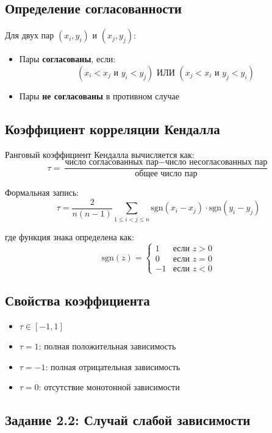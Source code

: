 \documentclass{article}
\begin{document}
\subsection{Определение согласованности}

Для двух пар $(x_i, y_i)$ и $(x_j, y_j)$:
\begin{itemize}
    \item Пары \textbf{согласованы}, если:
    \[ (x_i < x_j \text{ и } y_i < y_j) \text{ ИЛИ } (x_j < x_i \text{ и } y_j < y_i) \]
    \item Пары \textbf{не согласованы} в противном случае
\end{itemize}

\subsection{Коэффициент корреляции Кендалла}

Ранговый коэффициент Кендалла вычисляется как:
\[ \tau = \frac{\text{число согласованных пар} - \text{число несогласованных пар}}{\text{общее число пар}} \]

Формальная запись:
\[ \tau = \frac{2}{n(n-1)} \sum_{1 \leq i < j \leq n} \text{sgn}(x_i - x_j) \cdot \text{sgn}(y_i - y_j) \]

где функция знака определена как:
\[ \text{sgn}(z) = \begin{cases} 
1 & \text{если } z > 0 \\
0 & \text{если } z = 0 \\
-1 & \text{если } z < 0 
\end{cases} \]

\subsection{Свойства коэффициента}
\begin{itemize}
    \item $\tau \in [-1, 1]$
    \item $\tau = 1$: полная положительная зависимость
    \item $\tau = -1$: полная отрицательная зависимость
    \item $\tau = 0$: отсутствие монотонной зависимости
\end{itemize}

\subsection{Задание 2.2: Случай слабой зависимости}
\end{document}
